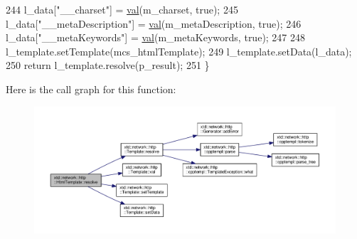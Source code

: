 \begin{DoxyCode}
244   l\_data[\textcolor{stringliteral}{"\_\_charset"}]         = \hyperlink{classxtd_1_1network_1_1http_1_1Template_aab2224df74586a476877a36db8ea2473}{val}(m\_charset, \textcolor{keyword}{true});
245   l\_data[\textcolor{stringliteral}{"\_\_metaDescription"}] = \hyperlink{classxtd_1_1network_1_1http_1_1Template_aab2224df74586a476877a36db8ea2473}{val}(m\_metaDescription, \textcolor{keyword}{true});
246   l\_data[\textcolor{stringliteral}{"\_\_metaKeywords"}]    = \hyperlink{classxtd_1_1network_1_1http_1_1Template_aab2224df74586a476877a36db8ea2473}{val}(m\_metaKeywords, \textcolor{keyword}{true});
247 
248   l\_template.setTemplate(mcs\_htmlTemplate);
249   l\_template.setData(l\_data);
250   \textcolor{keywordflow}{return} l\_template.resolve(p\_result);
251 \}
\end{DoxyCode}


Here is the call graph for this function\-:
\nopagebreak
\begin{figure}[H]
\begin{center}
\leavevmode
\includegraphics[width=350pt]{classxtd_1_1network_1_1http_1_1HtmlTemplate_af621b5bf866fa828f0bd5eaf225d5f70_cgraph}
\end{center}
\end{figure}


